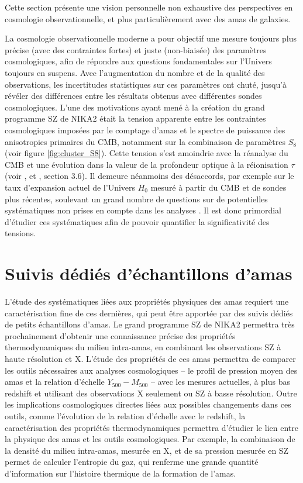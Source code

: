 Cette section présente une vision personnelle non exhaustive des perspectives en cosmologie observationnelle, et plus particulièrement avec des amas de galaxies.

La cosmologie observationnelle moderne a pour objectif une mesure toujours plus précise (avec des contraintes fortes) et juste (non-biaisée) des paramètres cosmologiques, afin de répondre aux questions fondamentales sur l'Univers toujours en suspens.
Avec l'augmentation du nombre et de la qualité des observations, les incertitudes statistiques sur ces paramètres ont chuté, jusqu'à révéler des différences entre les résultats obtenus avec différentes sondes cosmologiques.
L'une des motivations ayant mené à la création du grand programme SZ de NIKA2 était la tension apparente entre les contraintes cosmologiques imposées par le comptage d'amas et le spectre de puissance des anisotropies primaires du CMB, notamment sur la combinaison de paramètres $S_8$ (voir figure \ref{fig:cluster_S8}).
Cette tension s'est amoindrie avec la réanalyse du CMB et une évolution dans la valeur de la profondeur optique à la réionisation $\tau$ (voir \cite{salvati_constraints_2018}, et \cite{planck_collaboration_planck_2020}, section 3.6).
Il demeure néanmoins des désaccords, par exemple sur le taux d'expansion actuel de l'Univers $H_0$ mesuré à partir du CMB et de sondes plus récentes, soulevant un grand nombre de questions sur de potentielles systématiques non prises en compte dans les analyses \cite{efstathiou_h0_2021,freedman_measurements_2021}.
Il est donc primordial d'étudier ces systématiques afin de pouvoir quantifier la significativité des tensions.

\section*{Suivis dédiés d'échantillons d'amas}

L'étude des systématiques liées aux propriétés physiques des amas requiert une caractérisation fine de ces dernières, qui peut être apportée par des suivis dédiés de petits échantillons d'amas.
Le grand programme SZ de NIKA2 permettra très prochainement d'obtenir une connaissance précise des propriétés thermodynamiques du milieu intra-amas, en combinant les observations SZ à haute résolution et X.
L'étude des propriétés de ces amas permettra de comparer les outils nécessaires aux analyses cosmologiques -- le profil de pression moyen des amas et la relation d'échelle $Y_{500}-M_{500}$ -- avec les mesures actuelles, à plus bas redshift et utilisant des observations X seulement ou SZ à basse résolution.
Outre les implications cosmologiques directes liées aux possibles changements dans ces outils, comme l'évolution de la relation d'échelle avec le redshift, la caractérisation des propriétés thermodynamiques permettra d'étudier le lien entre la physique des amas et les outils cosmologiques.
Par exemple, la combinaison de la densité du milieu intra-amas, mesurée en X, et de sa pression mesurée en SZ permet de calculer l'entropie du gaz, qui renferme une grande quantité d'information sur l'histoire thermique de la formation de l'amas.

